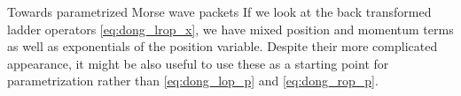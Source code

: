\begin{chapter}{Towards parametrized Morse wave packets}
If we look at the back transformed ladder operators \eqref{eq:dong_lrop_x}, we have mixed position
and momentum terms as well as exponentials of the position variable. Despite their more complicated 
appearance, it might be also useful to use these as a starting point
for parametrization rather than \eqref{eq:dong_lop_p}  and \eqref{eq:dong_rop_p}.






\end{chapter}
